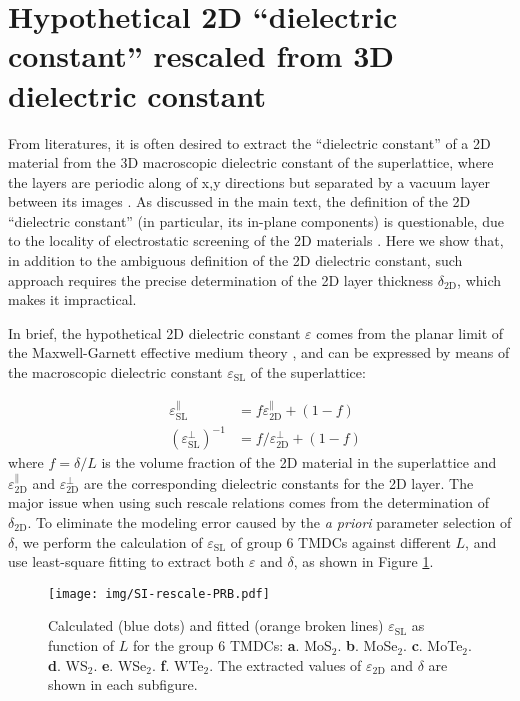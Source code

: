\documentclass[manuscript=suppinfo,email=true,hyperref=true,keywords=false]{achemso}
\begin{document}
\pagebreak{}
\section{Hypothetical 2D ``dielectric constant'' rescaled from 3D dielectric constant}
\label{sec:2D-3D-rescale}
From literatures, it is often desired to extract the ``dielectric
constant'' of a 2D material from the 3D macroscopic dielectric
constant of the superlattice, where the layers are periodic along of
x,y directions but separated by a vacuum layer between its images
\cite{Matthes_2016,Laturia_2018}. As discussed in the main text, the
definition of the 2D ``dielectric constant'' (in particular, its
in-plane components) is questionable, due to the locality of
electrostatic screening of the 2D materials
\cite{Cudazzo_2010_screen2D,Cudazzo_2011_screening_2D}. Here we show
that, in addition to the ambiguous definition of the 2D dielectric
constant, such approach requires the precise determination of the 2D
layer thickness $\delta_{\mathrm{2D}}$, which makes it impractical.

In brief, the hypothetical 2D dielectric constant
$\varepsilon$ comes from the planar limit of the
Maxwell-Garnett effective medium theory \cite{Markel_2016}, and can be
expressed by means of the macroscopic dielectric constant
$\varepsilon_{\mathrm{SL}}$ of the superlattice:

\begin{eqnarray}
  \label{eq:MG-effect-1}
  &\varepsilon_{\mathrm{SL}}^{\parallel} &= f \varepsilon_{\mathrm{2D}}^{\parallel} + (1 - f)\\
  \label{eq:MG-effect-2}
  &(\varepsilon_{\mathrm{SL}}^{\perp})^{-1} &= f /\varepsilon_{\mathrm{2D}}^{\perp} + (1-f)
\end{eqnarray}
where $f=\delta/L$ is the volume fraction of the 2D
material in the superlattice and $\varepsilon_{\mathrm{2D}}^{\parallel}$ and 
$\varepsilon_{\mathrm{2D}}^{\perp}$ are the corresponding dielectric constants for the 2D layer. 
The major issue when using such rescale
relations comes from the determination of $\delta_{\mathrm{2D}}$. To
eliminate the modeling error caused by the \textit{a priori} parameter
selection of $\delta$, we perform the calculation of
$\varepsilon_{\mathrm{SL}}$ of group 6 TMDCs against different $L$,
and use least-square fitting to extract both
$\varepsilon$ and $\delta$, as shown in
Figure \ref{fig:rescale-prb}.

\begin{figure}[htbp]
  \centering
  \texttt{[image: img/SI-rescale-PRB.pdf]}
  \caption{ Calculated (blue dots) and fitted
    (orange broken lines) $\varepsilon_{\mathrm{SL}}$ as function of
    $L$ for the group 6 TMDCs:
    \textbf{a}. MoS$_{2}$. \textbf{b}. MoSe$_{2}$. \textbf{c}.
    MoTe$_{2}$. \textbf{d}. WS$_{2}$. \textbf{e}. WSe$_{2}$. \textbf{f}.
    WTe$_{2}$. The extracted values of $\varepsilon_{\mathrm{2D}}$ and
    $\delta$ are shown in each subfigure.}
  \label{fig:rescale-prb}
\end{figure}
\end{document}
